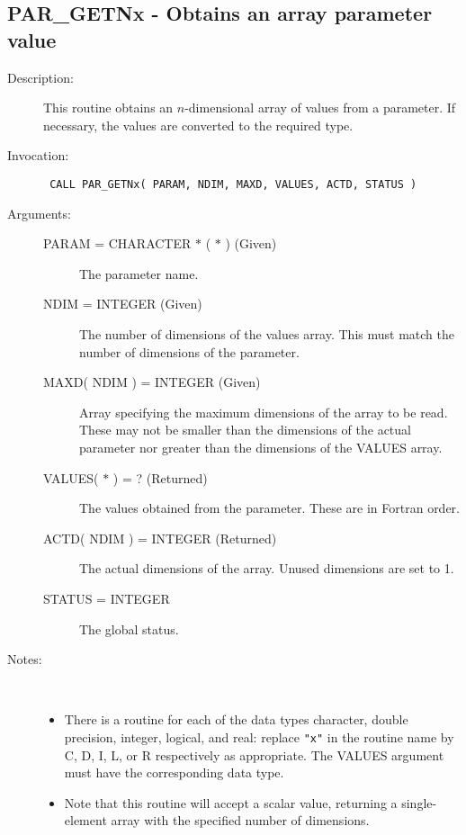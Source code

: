 \documentclass[twoside,11pt]{article}
\newcommand{\xlabel}[1]{}
\newlength{\sstbannerlength}
\newlength{\sstcaptionlength}
\newlength{\sstexampleslength}
\newlength{\sstexampleswidth}
\newcommand{\sstroutine}[3]{
   \goodbreak
   \rule{\textwidth}{0.5mm}
   \vspace{-7ex}
   \newline
   \settowidth{\sstbannerlength}{{\Large {\bf #1}}}
   \setlength{\sstcaptionlength}{\textwidth}
   \setlength{\sstexampleslength}{\textwidth}
   \addtolength{\sstbannerlength}{0.5em}
   \addtolength{\sstcaptionlength}{-2.0\sstbannerlength}
   \addtolength{\sstcaptionlength}{-5.0pt}
   \settowidth{\sstexampleswidth}{{\bf Examples:}}
   \addtolength{\sstexampleslength}{-\sstexampleswidth}
   \parbox[t]{\sstbannerlength}{\flushleft{\Large {\bf #1}}}
   \parbox[t]{\sstcaptionlength}{\center{\Large #2}}
   \parbox[t]{\sstbannerlength}{\flushright{\Large {\bf #1}}}
   \begin{description}
      #3
   \end{description}
}
\newcommand{\sstdescription}[1]{\item[Description:] #1}
\newcommand{\sstinvocation}[1]{\item[Invocation:]\hspace{0.4em}{\tt #1}}
\newcommand{\sstarguments}[1]{
   \item[Arguments:] \mbox{} \\
   \vspace{-3.5ex}
   \begin{description}
      #1
   \end{description}
}
\newcommand{\sstsubsection}[1]{ \item[{#1}] \mbox{} \\}
\newcommand{\sstnotes}[1]{\item[Notes:] \mbox{} \\[1.3ex] #1}
\newcommand{\sstitemlist}[1]{
  \mbox{} \\
  \vspace{-7ex}
  \begin{itemize}
     #1
  \end{itemize}
}
\newcommand{\sstitem}{\item}
\newcommand{\ssttt}{\tt}
\renewcommand{\sstroutine}[3]{
      \subsection{\xlabel{12}#1\xlabel{#1}-\label{#1}#2}
      \begin{description}
         #3
      \end{description}
   }
\renewcommand{\sstdescription}[1]{\item[Description:]
      \begin{description}
         #1
      \end{description}
   }
\renewcommand{\sstinvocation}[1]{\item[Invocation:]
      \begin{description}
         {\ssttt #1}
      \end{description}
   }
\renewcommand{\sstarguments}[1]{
      \item[Arguments:]
      \begin{description}
         #1
      \end{description}
   }
\renewcommand{\sstsubsection}[1]{\item[{#1}]}
\renewcommand{\sstnotes}[1]{\item[Notes:]
      \begin{description}
         #1
      \end{description}
   }
\newcommand{\sstitemlist}[1]{
      \begin{itemize}
         #1
      \end{itemize}
   }
\begin{document}
\sstroutine{
   PAR\_GETNx
}{
   Obtains an array parameter value
}{
   \sstdescription{
      This routine obtains an $n$-dimensional array of values from a
      parameter.  If necessary, the values are converted to the
      required type.
   }
   \sstinvocation{
      CALL PAR\_GETNx( PARAM, NDIM, MAXD, VALUES, ACTD, STATUS )
   }
   \sstarguments{
      \sstsubsection{
         PARAM = CHARACTER $*$ ( $*$ ) (Given)
      }{
         The parameter name.
      }
      \sstsubsection{
         NDIM = INTEGER (Given)
      }{
         The number of dimensions of the values array.
         This must match the number of dimensions of the parameter.
      }
      \sstsubsection{
         MAXD( NDIM ) = INTEGER (Given)
      }{
         Array specifying the maximum dimensions of the array to be
         read. These may not be smaller than the dimensions of the
         actual parameter nor greater than the dimensions of the VALUES
         array.
      }
      \sstsubsection{
         VALUES( $*$ ) = ? (Returned)
      }{
         The values obtained from the parameter.  These are in Fortran
         order.
      }
      \sstsubsection{
         ACTD( NDIM ) = INTEGER (Returned)
      }{
         The actual dimensions of the array.  Unused dimensions are set
         to 1.
      }
      \sstsubsection{
         STATUS = INTEGER
      }{
         The global status.
      }
   }
   \sstnotes{
      \sstitemlist{

         \sstitem
         There is a routine for each of the data types character,
         double precision, integer, logical, and real: replace {\tt "x"} in the
         routine name by C, D, I, L, or R respectively as appropriate.  The
         VALUES argument must have the corresponding data type.

         \sstitem
         Note that this routine will accept a scalar value, returning
         a single-element array with the specified number of dimensions.
      }
   }
}
\end{document}
